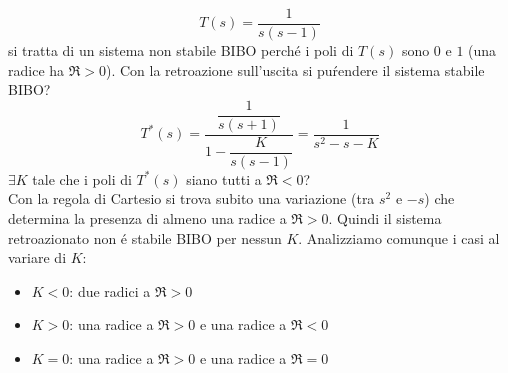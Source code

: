 \documentclass[../main.tex]{subfiles}
\begin{document}
		\begin{Exercise}[title={Studio stabilit\'a BIBO dopo retroazione sull'uscita}, difficulty=1]
			\[
				T(s) = \dfrac{1}{s(s-1)}
			\]
			si tratta di un sistema non stabile BIBO perch\'e i poli di $ T(s) $ sono $ 0 $ e $ 1 $ (una radice ha $ \Re > 0 $). Con la retroazione sull'uscita si pu\' rendere il sistema stabile BIBO?
			\[
				T^{*}(s) = \dfrac{\dfrac{1}{s(s+1)}}{1-\dfrac{K}{s(s-1)}} = \dfrac{1}{s^2-s-K}
			\]
			$ \exists K $ tale che i poli di $ T^{*}(s) $ siano tutti a $ \Re < 0 $?\\
			Con la regola di Cartesio si trova subito una variazione (tra $ s^2 $ e $ -s $) che determina la presenza di almeno una radice a $ \Re > 0 $. Quindi il sistema retroazionato non \'e stabile BIBO per nessun $ K $. Analizziamo comunque i casi al variare di $ K $:
			\begin{itemize}
				\item $ K < 0 $: due radici a $ \Re > 0 $
				\item $ K > 0 $: una radice a $ \Re > 0 $ e una radice a $ \Re < 0 $
				\item $ K = 0 $: una radice a $ \Re > 0 $ e una radice a $ \Re = 0 $
			\end{itemize}
		\end{Exercise}
\end{document}
